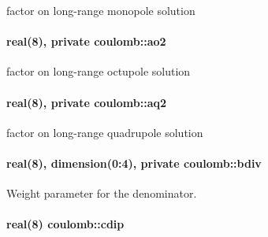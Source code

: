 factor on long-\/range monopole solution 

\paragraph[{\texorpdfstring{ao2}{ao2}}]{\setlength{\rightskip}{0pt plus 5cm}real(8), private coulomb\+::ao2\hspace{0.3cm}{\ttfamily [private]}}\hypertarget{namespacecoulomb_ab0ad8726c53cebe490cc86d05629aa7d}{}\label{namespacecoulomb_ab0ad8726c53cebe490cc86d05629aa7d}


factor on long-\/range octupole solution 

\paragraph[{\texorpdfstring{aq2}{aq2}}]{\setlength{\rightskip}{0pt plus 5cm}real(8), private coulomb\+::aq2\hspace{0.3cm}{\ttfamily [private]}}\hypertarget{namespacecoulomb_aa8782d256d115e0d23441160078bd1c5}{}\label{namespacecoulomb_aa8782d256d115e0d23441160078bd1c5}


factor on long-\/range quadrupole solution 

\paragraph[{\texorpdfstring{bdiv}{bdiv}}]{\setlength{\rightskip}{0pt plus 5cm}real(8), dimension(0\+:4), private coulomb\+::bdiv\hspace{0.3cm}{\ttfamily [private]}}\hypertarget{namespacecoulomb_a1c828ee6bc3b2445d27ed8ce44d78300}{}\label{namespacecoulomb_a1c828ee6bc3b2445d27ed8ce44d78300}


Weight parameter for the denominator. 

\paragraph[{\texorpdfstring{cdip}{cdip}}]{\setlength{\rightskip}{0pt plus 5cm}real(8) coulomb\+::cdip}\hypertarget{namespacecoulomb_a1f08c19f7be33ad2774d5604183d78ef}{}\label{namespacecoulomb_a1f08c19f7be33ad2774d5604183d78ef}


